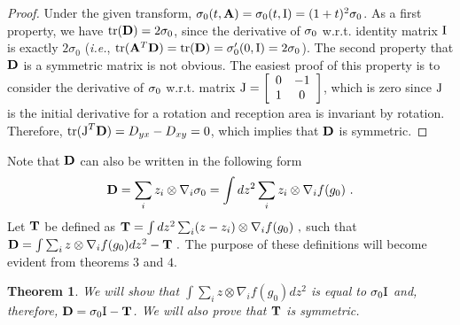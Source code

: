 \documentclass[12pt,english]{article}
\newtheorem{theorem}{Theorem}[section]
\begin{document}
\begin{proof}
Under the given transform, $\ss_0(t,\BA)=\ss_0(t,\BI)=(1+t)^2\ss_0$. As a first property, we have \mbox{$\tr(\BD)=2\ss_0$}, since the derivative of $\ss_0$ w.r.t. identity matrix $\BI$ is exactly $2\sigma_0$ ({\it i.e.}, {$\tr(\BA^T\BD)=\tr(\BD)=\sigma_0'(0,\BI)=2\ss_0$}). The second property that $\BD$ is a symmetric matrix is not obvious. The easiest proof of this property is to consider the derivative of $\ss_0$ w.r.t. matrix \mbox{$
\BJ=\left[
\begin{array}{cc}
0&-1\\
1&0
\end{array}
\right]
$},
which is zero since $\BJ$ is the initial derivative for a rotation and reception area is invariant by rotation. 
Therefore, \mbox{$\tr(\BJ^T\BD)=D_{yx}-D_{xy}=0$}, which implies that $\BD$ is symmetric. 
\end{proof}

Note that $\BD$ can also be written in the following form
$$
\BD=\sum\limits_{i}z_i\otimes\nabla_i\ss_0=\int dz^{2}\sum\limits_{i}z_i\otimes\nabla_if(g_0)~.
$$
Let $\BT$ be defined as
$
\BT=\int dz^2\sum_i (z-z_i)\otimes\nabla_i f(g_0)~,
$
such that
$
\BD=\int \sum_{i} z\otimes \nabla_i f(g_0)dz^2 - \BT~.
$
The purpose of these definitions will become evident from theorems $3$ and $4$.

\begin{theorem}
We will show that $\int \sum_{i} z\otimes \nabla_i f(g_0)dz^2$ is equal to $\ss_0\BI$ and, therefore, $\BD=\ss_0\BI-\BT$. We will also prove that $\BT$ is symmetric. 
\end{theorem}
\end{document}
